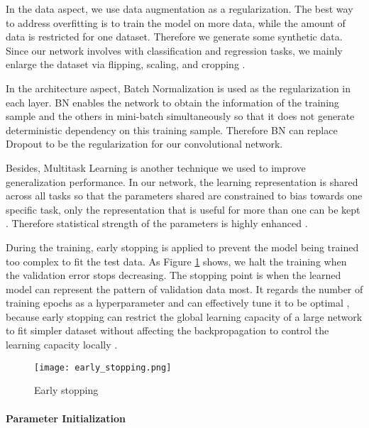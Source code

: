 In the data aspect, we use data augmentation as a regularization. The best way to address overfitting is to train the model on more data, while the amount of data is restricted for one dataset. Therefore we generate some synthetic data. Since our network involves with classification and regression tasks, we mainly enlarge the dataset via flipping, scaling, and cropping \tbd. 

In the architecture aspect, Batch Normalization \cite{DBLP:journals/corr/IoffeS15} is used as the regularization in each layer. BN enables the network to obtain the information of the training sample and the others in mini-batch simultaneously so that it does not generate deterministic dependency on this training sample. Therefore BN can replace Dropout \cite{JMLR:v15:srivastava14a} to be the regularization for our convolutional network. 

Besides, Multitask Learning is another technique we used to improve generalization performance. 
In our network, the learning representation is shared across all tasks so that the parameters shared are constrained to bias towards one specific task, \ie only the representation that is useful for more than one can be kept \cite{Goodfellow-et-al-2016}.  Therefore statistical strength of the parameters is highly enhanced \cite{Baxter:1995:LIR:225298.225336}.

During the training, early stopping is applied to prevent the model being trained too complex to fit the test data. As Figure \ref{figure:early_stopping} shows, we halt the training when the validation error stops decreasing.  The stopping point is when the learned model can represent the pattern of validation data most. It regards the number of training epochs as a hyperparameter and can effectively tune it to be optimal \cite{DBLP:journals/corr/abs-1206-5533},  because early stopping can restrict the global learning capacity of a large network to fit simpler dataset without affecting the backpropagation to control the learning capacity locally \cite{Caruana:2000:ONN:3008751.3008807}.


\begin{figure}[h]		
	\texttt{[image: early\_stopping.png]}
	\caption{Early stopping}
	\centering
	\label{figure:early_stopping}
\end{figure}

\paragraph{Parameter Initialization}

